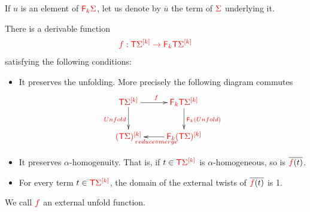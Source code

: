 If $u$ is an element of ${\color{red}{{\color{red}{\mathsf F_{k}}}\Sigma}}$, let us denote by $\overline{u}$ the term of ${\color{red}{\Sigma}}$ underlying it.
\begin{lemma}\label{lem:unfold-external-twist}
There is a derivable function
\begin{align*}
{\color{red}{f:{\color{red}{\mathsf T}}\Sigma^{{\color{red}{[k]}}} \to {\color{red}{\mathsf F_{k}}}{\color{red}{\mathsf T}}\Sigma^{{\color{red}{[k]}}}}}
\end{align*}
satisfying the following conditions:
\begin{itemize}
\item It preserves the unfolding. More precisely the following diagram commutes
\begin{align*}
\xymatrix{
\ar[r]^{\ranked{f}}     \ranked{\tmonad \mati k \Sigma}\ar[d]_{\ranked{Unfold}}& \ranked{\reduce k \tmonad \mati k \Sigma}\ar[d]^{\ranked{\reduce k(Unfold)}}\\
     \ranked{\mati k {(\tmonad\Sigma)}}& \ar[l]^{\ranked{reduce\circ merge}}\ranked{\reduce k \mati k {(\tmonad\Sigma)}}
}
\end{align*}
\item It preserves $\alpha$-homogenuity. That is, if $t\in{\color{red}{{\color{red}{\mathsf T}}{\color{red}{\Sigma}}^{{\color{red}{[k]}}}}}$ is $\alpha$-homogeneous, so is $\overline{{\color{red}{f}}(t)}$.
\item  For every term $t\in {\color{red}{{\color{red}{\mathsf T}}{\color{red}{\Sigma}}^{{\color{red}{[k]}}}}}$, the domain of the external twists of $\overline{{\color{red}{f}}(t)}$ is 1.
\end{itemize}
We call ${\color{red}{f}}$ an external unfold function.
\end{lemma}

